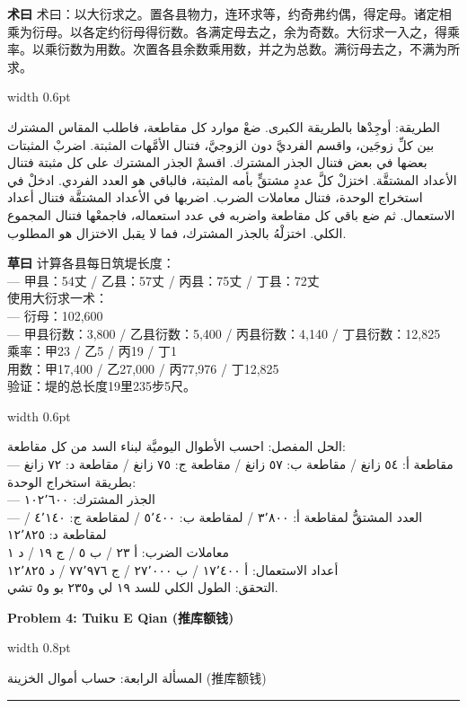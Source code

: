 \documentclass[11pt,a4paper]{article}
\newlength{\cnwidth}
\newlength{\arwidth}
\newcommand{\paralleltext}[2]{%
  \par\medskip\noindent
  \begin{minipage}[t]{\cnwidth}%
    \small #1%
  \end{minipage}%
  \hfill\textcolor{colrule}{\vrule width 0.6pt}\hfill
  \begin{minipage}[t]{\arwidth}%
    \small\arabicfont\beginR #2\endR%
  \end{minipage}%
  \par\medskip
}
\newcommand{\parallelsection}[2]{%
  \par\bigskip\noindent
  \begin{minipage}[t]{\cnwidth}%
    \Large\bfseries\color{sectioncolor} #1%
  \end{minipage}%
  \hfill\textcolor{colrule}{\vrule width 0.8pt}\hfill
  \begin{minipage}[t]{\arwidth}%
    \Large\arabicfontbf\color{sectioncolor}\beginR #2\endR%
  \end{minipage}%
  \par\medskip\noindent\textcolor{colrule}{\rule{\textwidth}{0.6pt}}\par\medskip
}
\newcommand{\cnlabel}[1]{\textbf{\color{notecolor}#1}}
\newcommand{\arlabel}[1]{\arabicfontbf\color{notecolor}\beginR #1\endR}
\begin{document}
\paralleltext{%
\cnlabel{术曰} 术曰：以大衍求之。置各县物力，连环求等，约奇弗约偶，得定母。诸定相乘为衍母。以各定约衍母得衍数。各满定母去之，余为奇数。大衍求一入之，得乘率。以乘衍数为用数。次置各县余数乘用数，并之为总数。满衍母去之，不满为所求。%
}{%
\arlabel{الطريقة:} أوجِدْها بالطريقة الكبرى. ضعْ موارد كل مقاطعة، فاطلب المقاس المشترك بين كلِّ زوجَين، واقسم الفرديَّ دون الزوجيَّ، فتنال الأمَّهات المثبتة. اضربْ المثبتات بعضها في بعض فتنال الجذر المشترك. اقسمْ الجذر المشترك على كل مثبتة فتنال الأعداد المشتقَّة. اختزلْ كلَّ عددٍ مشتقٍّ بأمه المثبتة، فالباقي هو العدد الفردي. ادخلْ في استخراج الوحدة، فتنال معاملات الضرب. اضربها في الأعداد المشتقَّة فتنال أعداد الاستعمال. ثم ضع باقي كل مقاطعة واضربه في عدد استعماله، فاجمعْها فتنال المجموع الكلي. اختزلْهُ بالجذر المشترك، فما لا يقبل الاختزال هو المطلوب.
}

\paralleltext{%
\cnlabel{草曰} 计算各县每日筑堤长度：\\
--- 甲县：54丈 / 乙县：57丈 / 丙县：75丈 / 丁县：72丈\\
使用大衍求一术：\\
--- 衍母：102,600\\
--- 甲县衍数：3,800 / 乙县衍数：5,400 / 丙县衍数：4,140 / 丁县衍数：12,825\\
乘率：甲23 / 乙5 / 丙19 / 丁1\\
用数：甲17,400 / 乙27,000 / 丙77,976 / 丁12,825\\
验证：堤的总长度19里235步5尺。%
}{%
\arlabel{الحل المفصل:} احسب الأطوال اليوميَّة لبناء السد من كل مقاطعة:\\
--- مقاطعة أ: ٥٤ زانغ / مقاطعة ب: ٥٧ زانغ / مقاطعة ج: ٧٥ زانغ / مقاطعة د: ٧٢ زانغ\\
بطريقة استخراج الوحدة:\\
--- الجذر المشترك: ١٠٢٬٦٠٠\\
--- العدد المشتقُّ لمقاطعة أ: ٣٬٨٠٠ / لمقاطعة ب: ٥٬٤٠٠ / لمقاطعة ج: ٤٬١٤٠ / لمقاطعة د: ١٢٬٨٢٥\\
معاملات الضرب: أ ٢٣ / ب ٥ / ج ١٩ / د ١\\
أعداد الاستعمال: أ ١٧٬٤٠٠ / ب ٢٧٬٠٠٠ / ج ٧٧٬٩٧٦ / د ١٢٬٨٢٥\\
التحقق: الطول الكلي للسد ١٩ لي و٢٣٥ بو و٥ تشي.
}

\newpage

\parallelsection{Problem 4: Tuiku E Qian (推库额钱)}{المسألة الرابعة: حساب أموال الخزينة (推库额钱)}
\end{document}
